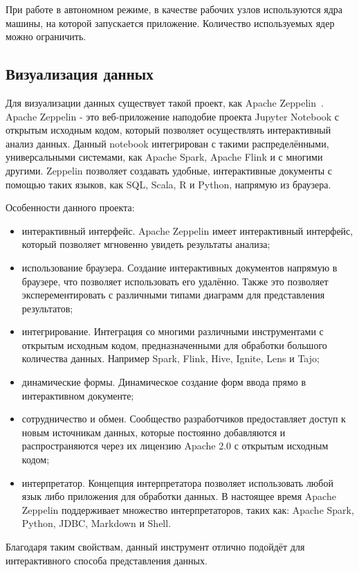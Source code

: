 При работе в автономном режиме, в качестве рабочих узлов используются ядра машины, на которой запускается приложение.
Количество используемых ядер можно ограничить.
    
\subsection{Визуализация данных}

Для визуализации данных существует такой проект, как Apache Zeppelin~\cite{zeppelin_documentation_intro}.
Apache Zeppelin - это веб-приложение наподобие проекта Jupyter Notebook с открытым исходным кодом, который  позволяет осуществлять интерактивный анализ данных.
Данный notebook интегрирован с такими распределёнными, универсальными системами, как Apache Spark, Apache Flink и с многими другими.
Zeppelin позволяет создавать удобные, интерактивные документы с помощью таких языков, как SQL, Scala, R и Python, напрямую из браузера.

Особенности данного проекта:
\begin{itemize}
    \item интерактивный интерфейс. Apache Zeppelin имеет интерактивный интерфейс, который позволяет мгновенно увидеть результаты анализа;
    \item использование браузера. Создание интерактивных документов напрямую в браузере, что позволяет использовать его удалённо. Также это позволяет эксперементировать с различными типами диаграмм для представления результатов;
	\item интегрирование. Интеграция со многими различными инструментами с открытым исходным кодом, предназначенными для обработки большого количества данных. Например Spark, Flink, Hive, Ignite, Lens и Tajo;
	\item динамические формы. Динамическое создание форм ввода прямо в интерактивном документе;
    \item сотрудничество и обмен. Сообщество разработчиков предоставляет доступ к новым источникам данных, которые постоянно добавляются и распространяются через их лицензию Apache 2.0 с открытым исходным кодом;
    \item интерпретатор. Концепция интерпретатора позволяет использовать любой язык либо приложения для обработки данных. В настоящее время Apache Zeppelin поддерживает множество интерпретаторов, таких как: Apache Spark, Python, JDBC, Markdown и Shell.
\end{itemize}

Благодаря таким свойствам, данный инструмент отлично подойдёт для интерактивного способа представления данных.

